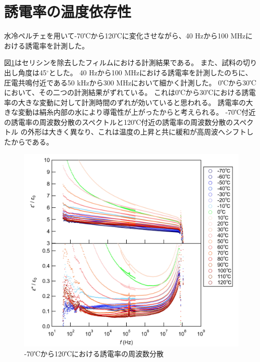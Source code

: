 \documentclass[dvipdfmx,12pt,a4paper]{jreport}
\begin{document}
			\section{誘電率の温度依存性}
			水冷ペルチェを用いて-70℃から120℃に変化させながら、40 Hzから100 MHzにおける誘電率を計測した。
			
			図\ref{温度_誘電率_セリシンなし_全体像}はセリシンを除去したフィルムにおける計測結果である。
			また、試料の切り出し角度は45$^{\circ}$とした。
			40 Hzから100 MHzにおける誘電率を計測したのちに、
			圧電共鳴付近である50 kHzから300 MHzにおいて細かく計測した。
			0℃から30℃において、その二つの計測結果がずれている。
			これは0℃から30℃における誘電率の大きな変動に対して計測時間のずれが効いていると思われる。
			誘電率の大きな変動は絹糸内部の水により導電性が上がったからと考えられる。
			-70℃付近の誘電率の周波数分散のスペクトルと120℃付近の誘電率の周波数分散のスペクトル
			の外形は大きく異なり、これは温度の上昇と共に緩和が高周波へシフトしたからである。
			\begin{figure}[h]
				\centering
				\includegraphics[scale=0.8]{温度_誘電率_セリシンなし.jpg}
				\caption{-70℃から120℃における誘電率の周波数分散}
				\label{温度_誘電率_セリシンなし_全体像}
			\end{figure}
\end{document}
